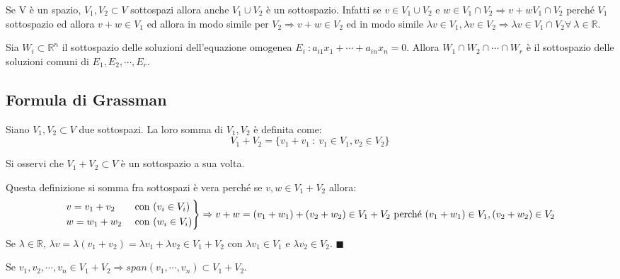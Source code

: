 \begin{observation}
Se V è un spazio, $V_1, V_2 \subset V$ sottospazi allora anche $V_1 \cup V_2$ è un sottospazio. Infatti se $v \in V_1 \cup V_2$ e $w \in V_1 \cap V_2 \Longrightarrow v+w V_1 \cap V_2$ perché $V_1$ sottospazio ed allora $v + w \in V_1$ ed allora in modo simile per $V_2 \Longrightarrow v + w \in V_2$ ed in modo simile $\lambda v \in V_1, \lambda v \in V_2 \Longrightarrow \lambda v \in V_1 \cap V_2 \forall \: \lambda \in \mathbb{R}$.
\end{observation}

\begin{example}
Sia $W_i \subset \mathbb{R}^n$ il sottospazio delle soluzioni dell'equazione omogenea $E_i \:: a_{i1}x_1 + \cdots + a_{in}x_n = 0$. Allora $W_1 \cap W_2 \cap \cdots \cap W_r$ è il sottospazio delle soluzioni comuni di $E_1, E_2, \cdots, E_r$.
\end{example}

\subsection{Formula di Grassman}
\begin{definition}
Siano $V_1, V_2 \subset V$ due sottospazi. La loro somma di $V_1, V_2$ è definita come:
\[V_1 + V_2 = \{v_1 + v_1 \::\: v_1 \in V_1, v_2 \in V_2\}\]
\end{definition}

\begin{observation}
Si osservi che $V_1 + V_2 \subset V$ è un sottospazio a sua volta.
\end{observation}

\begin{demostration}
Questa definizione si somma fra sottospazi è vera perché se $v, w \in V_1 + V_2$ allora:
\[
\begin{rcases}
v = v_1 + v_2 & \text{ con } (v_i \in V_i)\\
w = w_1 + w_2 & \text{ con } (w_i \in V_i)
\end{rcases}
\Rightarrow v+w = (v_1 + w_1) + (v_2 + w_2) \in V_1 + V_2 \text{ perché }(v_1 + w_1) \in V_1, (v_2 + w_2) \in V_2
\]
Se $\lambda \in \mathbb{R}$, $\lambda v = \lambda(v_1 + v_2) = \lambda v_1 + \lambda v_2 \in V_1 + V_2$ con $\lambda v_1 \in V_1$ e $\lambda v_2 \in V_2$. $\blacksquare$
\end{demostration}

\begin{proposition}
Se $v_1, v_2, \cdots, v_n \in V_1 + V_2 \Longrightarrow span(v_1, \cdots, v_n) \subset V_1 + V_2$.
\end{proposition}

